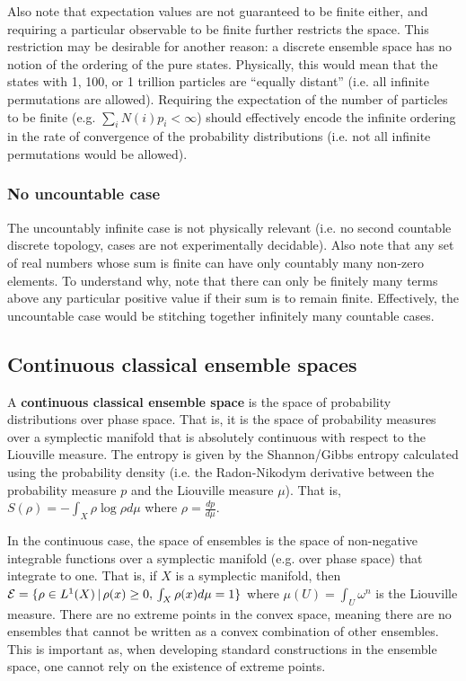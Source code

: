 Also note that expectation values are not guaranteed to be finite either, and requiring a particular observable to be finite further restricts the space. This restriction may be desirable for another reason: a discrete ensemble space has no notion of the ordering of the pure states. Physically, this would mean that the states with 1, 100, or 1 trillion particles are ``equally distant'' (i.e. all infinite permutations are allowed). Requiring the expectation of the number of particles to be finite (e.g. $\sum_i N(i) p_i < \infty$) should effectively encode the infinite ordering in the rate of convergence of the probability distributions (i.e. not all infinite permutations would be allowed).

\subsubsection{No uncountable case}

The uncountably infinite case is not physically relevant (i.e. no second countable discrete topology, cases are not experimentally decidable). Also note that any set of real numbers whose sum is finite can have only countably many non-zero elements. To understand why, note that there can only be finitely many terms above any particular positive value if their sum is to remain finite. Effectively, the uncountable case would be stitching together infinitely many countable cases.

\subsection{Continuous classical ensemble spaces}

\begin{defn}
	A \textbf{continuous classical ensemble space} is the space of probability distributions over phase space. That is, it is the space of probability measures over a symplectic manifold that is absolutely continuous with respect to the Liouville measure. The entropy is given by the Shannon/Gibbs entropy calculated using the probability density (i.e. the Radon-Nikodym derivative between the probability measure $p$ and the Liouville measure $\mu$). That is, $S(\rho) = - \int_X \rho \log \rho d\mu$ where $\rho = \frac{dp}{d\mu}$.
\end{defn}

In the continuous case, the space of ensembles is the space of non-negative integrable functions over a symplectic manifold (e.g.  over phase space) that integrate to one. That is, if $X$ is a symplectic manifold, then $\mathcal{E} = \{ \rho \in L^1(X) \, | \, \rho(x) \geq 0, \, \int_X \rho(x) d\mu = 1 \} $ where $\mu(U)=\int_U \omega^n$ is the Liouville measure. There are no extreme points in the convex space, meaning there are no ensembles that cannot be written as a convex combination of other ensembles. This is important as, when developing standard constructions in the ensemble space, one cannot rely on the existence of extreme points.

